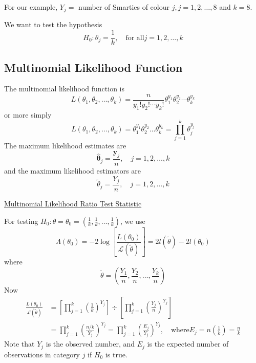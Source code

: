\documentclass[oneside]{book}
\newcommand{\Vector}[1]{\boldsymbol{#1}}
\begin{document}
For our example, $Y_{j}=$ number of Smarties of colour $j, j=1,2, \ldots, 8$ and $k=8$.

We want to test the hypothesis
\[ H_{0}: \theta_{j}=\frac{1}{k}, \quad \text{for all} j=1,2, \ldots, k \]

\subsection{Multinomial Likelihood Function}
The multinomial likelihood function is
\[
    L\left(\theta_{1}, \theta_{2}, \ldots, \theta_{k}\right)=\frac{n}{y_{1} ! y_{2} ! \cdots y_{k} !} \theta_{1}^{y_{1}} \theta_{2}^{y_{2}} \cdots \theta_{k}^{y_{k}}
\]
or more simply
\[
    L\left(\theta_{1}, \theta_{2}, \ldots, \theta_{k}\right)=\theta_{1}^{y_{1}} \theta_{2}^{y_{2}} \ldots \theta_{k}^{y_{k}}=\prod_{j=1}^{k} \theta_{j}^{y_{j}}
\]
The maximum likelihood estimates are
\[
    \hat{\Vector{\theta}}_{j}=\frac{\Vector{y}_{j}}{n}, \quad j=1,2, \ldots, k
\]
and the maximum likelihood estimators are
\[
    \tilde{\theta}_{j}=\frac{Y_{j}}{n}, \quad j=1,2, \ldots, k
\]

\underline{Multinomial Likelihood Ratio Test Statistic}

For testing $H_{0}: \theta=\theta_{0}=\left(\frac{1}{k}, \frac{1}{k}, \ldots, \frac{1}{k}\right)$, we use
\[
    \Lambda\left(\theta_{0}\right)=-2 \log \left[\frac{L\left(\theta_{0}\right)}{\mathcal{L}(\tilde{\theta})}\right]=2 l(\tilde{\theta})-2 l\left(\theta_{0}\right)
\]
where
\[
    \tilde{\theta}=\left(\frac{Y_{1}}{n}, \frac{Y_{2}}{n}, \ldots, \frac{Y_{k}}{n}\right)
\]
Now
\[
    \begin{aligned}
        \frac{L\left(\theta_{0}\right)}{\mathcal{L}(\tilde{\theta})} & =\left[\prod_{j=1}^{k}\left(\frac{1}{k}\right)^{Y_{j}}\right] \div\left[\prod_{j=1}^{k}\left(\frac{Y_{j}}{n}\right)^{Y_{j}}\right]                                               \\
                                                                     & =\prod_{j=1}^{k}\left(\frac{n / k}{Y_{j}}\right)^{Y_{j}}=\prod_{j=1}^{k}\left(\frac{E_{j}}{Y_{j}}\right)^{Y_{j}}, \quad \text{where} E_{j}=n\left(\frac{1}{k}\right)=\frac{n}{k}
    \end{aligned}
\]
Note that $Y_{j}$ is the observed number, and $E_{j}$ is the expected number of observations in category $j$ if $H_{0}$ is true.
\end{document}
